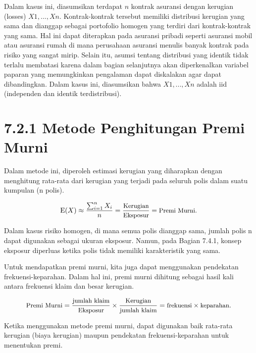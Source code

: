 \documentclass[
]{book}
\begin{document}
Dalam kasus ini, diasumsikan terdapat \(n\) kontrak asuransi dengan kerugian (losses) \(X1,...,Xn\). Kontrak-kontrak tersebut memiliki distribusi kerugian yang sama dan dianggap sebagai portofolio homogen yang terdiri dari kontrak-kontrak yang sama. Hal ini dapat diterapkan pada asuransi pribadi seperti asuransi mobil atau asuransi rumah di mana perusahaan asuransi menulis banyak kontrak pada risiko yang sangat mirip. Selain itu, asumsi tentang distribusi yang identik tidak terlalu membatasi karena dalam bagian selanjutnya akan diperkenalkan variabel paparan yang memungkinkan pengalaman dapat diskalakan agar dapat dibandingkan. Dalam kasus ini, diasumsikan bahwa \(X1,...,Xn\) adalah iid (independen dan identik terdistribusi).

\hypertarget{metode-penghitungan-premi-murni}{%
\section{7.2.1 Metode Penghitungan Premi Murni}\label{metode-penghitungan-premi-murni}}

Dalam metode ini, diperoleh estimasi kerugian yang diharapkan dengan menghitung rata-rata dari kerugian yang terjadi pada seluruh polis dalam suatu kumpulan (n polis).

\begin{equation}
\small{
\mathrm{E}(X) \approx \frac{\sum_{i=1}^n X_i}{n} = \frac{\text{Kerugian}}{\text{Eksposur}} = \text{Premi Murni}.
}
\end{equation}

Dalam kasus risiko homogen, di mana semua polis dianggap sama, jumlah polis n dapat digunakan sebagai ukuran eksposur. Namun, pada Bagian 7.4.1, konsep eksposur diperluas ketika polis tidak memiliki karakteristik yang sama.

Untuk mendapatkan premi murni, kita juga dapat menggunakan pendekatan frekuensi-keparahan. Dalam hal ini, premi murni dihitung sebagai hasil kali antara frekuensi klaim dan besar kerugian.

\begin{equation}
\small{
\text{Premi Murni} = \frac{\text{jumlah klaim}}{\text{Eksposur}} \times \frac{\text{Kerugian}}{\text{jumlah klaim}} = \text{frekuensi} \times \text{keparahan}.
}
\end{equation}

Ketika menggunakan metode premi murni, dapat digunakan baik rata-rata kerugian (biaya kerugian) maupun pendekatan frekuensi-keparahan untuk menentukan premi.
\end{document}
